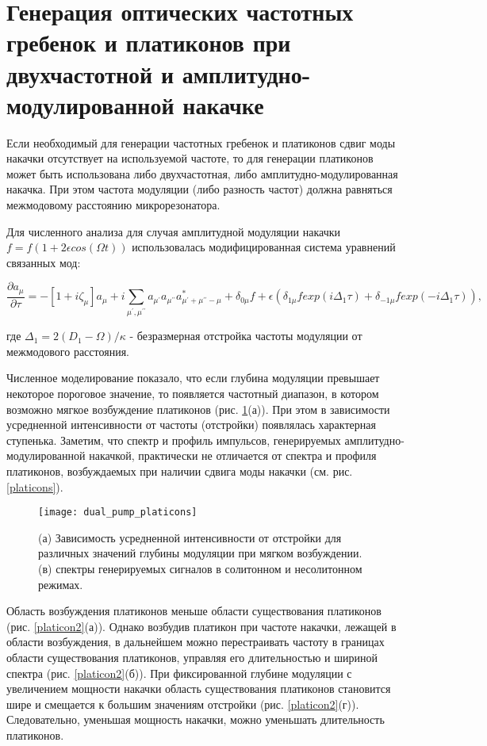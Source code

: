 \section{Генерация оптических частотных гребенок и платиконов при двухчастотной и амплитудно-модулированной накачке}

Если необходимый для генерации частотных гребенок и платиконов сдвиг моды накачки отсутствует на используемой частоте, то для генерации платиконов может быть использована либо двухчастотная, либо амплитудно-модулированная накачка. При этом частота модуляции (либо разность частот) должна равняться межмодовому расстоянию микрорезонатора.

Для численного анализа для случая амплитудной модуляции накачки $f=f(1+2\epsilon cos(\Omega t))$ использовалась модифицированная система уравнений связанных мод:

\begin{equation}
\frac{\partial a_\mu}{\partial \tau}=-[1+i\zeta_{\mu}]a_\mu+i\sum_{\mu^\prime,\mu^{\prime\prime}} a_{\mu^\prime}a_{\mu^{\prime\prime}}a_{\mu^\prime+\mu^{\prime\prime}-\mu}^*+\delta_{0\mu}f+\epsilon(\delta_{1\mu}f exp(i\Delta_1\tau)+\delta_{-1\mu}f exp(-i\Delta_1\tau)),
\end{equation}

где $\Delta_1=2(D_1-\Omega)/\kappa$ - безразмерная отстройка частоты модуляции от межмодового расстояния.

Численное моделирование показало, что если глубина модуляции превышает некоторое пороговое значение, то появляется частотный диапазон, в котором возможно мягкое возбуждение платиконов (рис. \ref{dual_pump_platicons}(а)). При этом в зависимости усредненной интенсивности от частоты (отстройки) появлялась характерная ступенька. Заметим, что спектр и профиль импульсов, генерируемых амплитудно-модулированной накачкой, практически не отличается от спектра и профиля платиконов, возбуждаемых при наличии сдвига моды накачки (см. рис. \ref{platicons}).

\begin{figure}
  \centering
  \texttt{[image: dual\_pump\_platicons]}
  \caption{(а) Зависимость усредненной интенсивности от отстройки для различных значений глубины модуляции при мягком возбуждении. (в) спектры генерируемых сигналов в солитонном и несолитонном режимах.} \label{dual_pump_platicons}
\end{figure}


Область возбуждения платиконов меньше области существования платиконов (рис. \ref{platicon2}(а)). Однако возбудив платикон при частоте накачки, лежащей в области возбуждения, в дальнейшем можно перестраивать частоту в границах области существования платиконов, управляя его длительностью и шириной спектра (рис. \ref{platicon2}(б)). При фиксированной глубине модуляции с увеличением мощности накачки область существования платиконов становится шире и смещается к большим значениям отстройки (рис. \ref{platicon2}(г)). Следовательно, уменьшая мощность накачки, можно уменьшать длительность платиконов.

